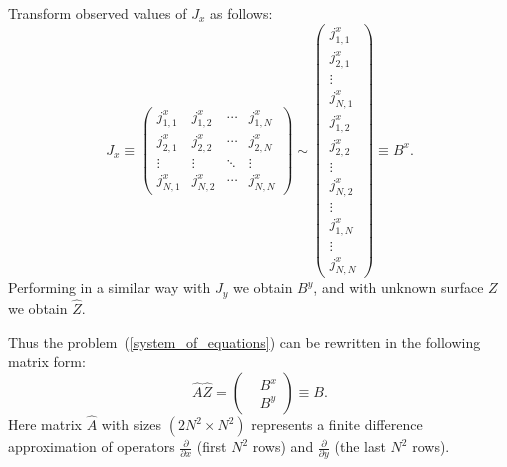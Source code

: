 \documentclass{beamer}
\begin{document}
\begin{frame}[c,allowframebreaks]
    Transform observed values of $J_x$ as follows:
    \begin{equation}
        \label{column-major_ordering}
        J_x \equiv
        \left(
            \begin{array}{cccc}
                j^x_{1,1} & j^x_{1,2} & \cdots & j^x_{1,N} \\
                j^x_{2,1} & j^x_{2,2} & \cdots & j^x_{2,N} \\
                \vdots & \vdots & \ddots & \vdots  \\
                j^x_{N,1} & j^x_{N,2} & \cdots & j^x_{N,N}
            \end{array}
        \right)
        \sim
        \left(
            \begin{array}{c}
                j^x_{1,1} \\
                j^x_{2,1} \\
                \vdots \\
                j^x_{N,1} \\
                j^x_{1,2} \\
                j^x_{2,2} \\
                \vdots \\
                j^x_{N,2} \\
                \vdots \\
                j^x_{1,N} \\
                \vdots \\
                j^x_{N,N}
            \end{array}
        \right)
        \equiv{}  B^x.
    \end{equation}
    Performing in a similar way with $J_y$ we obtain $B^y$, and with unknown surface $Z$ we obtain $\hat{Z}$.


    Thus the problem~(\ref{system_of_equations}) can be rewritten in the following matrix form:
    \begin{equation*}
        \label{matrix_equation}
        \hat{A} \hat{Z}  =
        \left(
        \begin{aligned}
            &B^x\\
            &B^y
        \end{aligned}
        \right)
        \equiv B.
    \end{equation*}
    Here matrix $\hat{A}$ with sizes $(2N^2 \times N^2)$ represents a finite difference
    approximation of operators $\frac{\partial}{\partial x}$ (first $N^2$ rows) and
    $\frac{\partial}{\partial y}$ (the last $N^2$ rows).


\end{frame}
\end{document}

